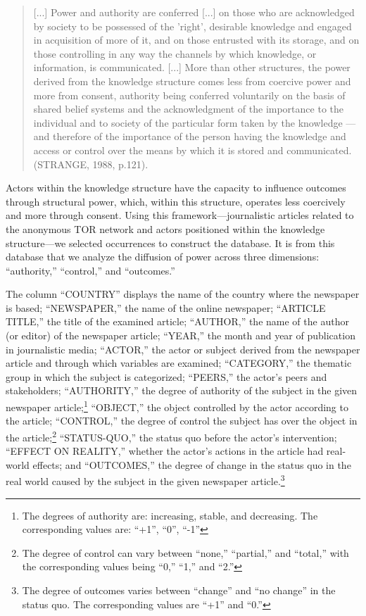 \begin{quote}
[...] Power and authority are conferred [...] on those who are acknowledged by society to be possessed of the 'right', desirable knowledge and engaged in acquisition of more of it, and on those entrusted with its storage, and on those controlling in any way the channels by which knowledge, or information, is communicated. [...] More than other structures, the power derived from the knowledge structure comes less from coercive power and more from consent, authority being conferred voluntarily on the basis of shared belief systems and the acknowledgment of the importance to the individual and to society of the particular form taken by the knowledge — and therefore of the importance of the person having the knowledge and access or control over the means by which it is stored and communicated. (STRANGE, 1988, p.121).
\end{quote} 
Actors within the knowledge structure have the capacity to influence outcomes through structural power, which, within this structure, operates less coercively and more through consent. Using this framework—journalistic articles related to the anonymous TOR network and actors positioned within the knowledge structure—we selected occurrences to construct the database. It is from this database that we analyze the diffusion of power across three dimensions: “authority,” “control,” and “outcomes.”

The column “COUNTRY” displays the name of the country where the newspaper is based; “NEWSPAPER,” the name of the online newspaper; “ARTICLE TITLE,” the title of the examined article; “AUTHOR,” the name of the author (or editor) of the newspaper article; “YEAR,” the month and year of publication in journalistic media; “ACTOR,” the actor or subject derived from the newspaper article and through which variables are examined; “CATEGORY,” the thematic group in which the subject is categorized; “PEERS,” the actor's peers and stakeholders; “AUTHORITY,” the degree of authority of the subject in the given newspaper article;\footnote{The degrees of authority are: increasing, stable, and decreasing. The corresponding values are:
“+1”, “0”, “-1”} “OBJECT,” the object controlled by the actor according to the article; “CONTROL,” the degree of control the subject has over the object in the article;\footnote{The degree of control can vary between “none,” “partial,” and “total,” with the corresponding values being “0,” “1,” and “2.”} “STATUS-QUO,” the status quo before the actor's intervention; “EFFECT ON REALITY,” whether the actor's actions in the article had real-world effects; and “OUTCOMES,” the degree of change in the status quo in the real world caused by the subject in the given newspaper article.\footnote{The degree of outcomes varies between “change” and “no change” in the status quo. The corresponding values are “+1” and “0.”}

